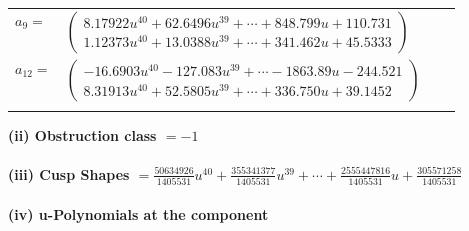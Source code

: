 \documentclass[1p]{elsarticle_modified}
\theoremstyle{definition}
\begin{document}
\begin{tabular}{m{7pt} m{180pt} m{7pt} m{180pt} }
\flushright $a_{9}=$&$\begin{pmatrix}8.17922 u^{40}+62.6496 u^{39}+\cdots+848.799 u+110.731\\1.12373 u^{40}+13.0388 u^{39}+\cdots+341.462 u+45.5333\end{pmatrix}$ \\
\flushright $a_{12}=$&$\begin{pmatrix}-16.6903 u^{40}-127.083 u^{39}+\cdots-1863.89 u-244.521\\8.31913 u^{40}+52.5805 u^{39}+\cdots+336.750 u+39.1452\end{pmatrix}$\\&\end{tabular}
\flushleft \textbf{(ii) Obstruction class $= -1$}\\~\\
\flushleft \textbf{(iii) Cusp Shapes $= \frac{50634926}{1405531} u^{40}+\frac{355341377}{1405531} u^{39}+\cdots+\frac{2555447816}{1405531} u+\frac{305571258}{1405531}$}\\~\\
\newpage\renewcommand{\arraystretch}{1}
\flushleft \textbf{(iv) u-Polynomials at the component}\newline \\
\end{document}

